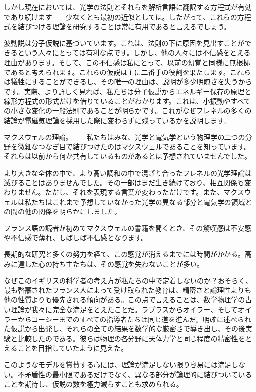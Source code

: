 \documentclass[a4paper,11pt,openany]{ltjsbook}
\begin{document}
しかし現在においては、光学の法則とそれらを解析言語に翻訳する方程式が有効であり続けます——少なくとも最初の近似としては。したがって、これらの方程式を結びつける理論を研究することは常に有用であると言えるでしょう。

波動説は分子仮説に基づいています。これは、法則の下に原因を見出すことができるという人々にとっては有利な点です。しかし、他の人々には不信感をとえる理由があります。そして、この不信感は私にとって、以前の幻覚と同様に無根拠であると考えられます。これらの仮説は主に二番手の役割を果たします。これらは犠牲にすることができるし、その唯一の理由は、説明が多少明瞭さを失うからです。実際、より詳しく見れば、私たちは分子仮説からエネルギー保存の原理と線形方程式の形式だけを借りていることがわかります。これは、小振動やすべての小さな変化の一般法則であることが明らかです。これがなぜフレネルの多くの結論が電磁気理論を採用した際に変わらずに残っているかを説明します。

マクスウェルの理論。——私たちはみな、光学と電気学という物理学の二つの分野を微細なつなぎ目で結びつけたのはマクスウェルであることを知っています。それらは以前から何か共有しているものがあるとは予想されていませんでした。

より大きな全体の中で、より高い調和の中で混ざり合ったフレネルの光学理論は滅びることはありませんでした。その一部はまだ生き続けており、相互関係も変わりません。ただし、それを表現する言葉が変わっただけです。また、マクスウェルは私たちはこれまで予想していなかった光学の異なる部分と電気学の領域との間の他の関係を明らかにしました。

フランス語の読者が初めてマクスウェルの書籍を開くとき、その驚嘆感は不安感や不信感で薄れ、しばしば不信感となります。

長期的な研究と多くの努力を経て、この感覚が消えるまでには時間がかかる。高みに達した心の持ち主たちは、その感覚を失わないことが多い。

なぜこのイギリスの科学者の考え方が私たちの中で定着しないのか？おそらく、最も啓蒙されたフランス人によって受け取られた教育は、精密さと論理性よりも他の性質よりも優先される傾向がある。この点で言えることは、数学物理学の古い理論が我々に完全な満足をとえたことだ。ラプラスからオイラー、そしてオイラーからコーシーまでのすべての指導者たちは同じ道を進んだ。明確に述べられた仮説から出発し、それらの全ての結果を数学的な厳密さで導き出し、その後実験と比較したのである。彼らは物理の各分野に天体力学と同じ程度の精密性をとえることを目指していたように見えた。

このようなモデルを賞賛する心には、理論が満足しない限り容易には満足しない。不矛盾性の最小限であるだけでなく、異なる部分が論理的に結びついていることを期待し、仮説の数を極力減らすことも求められる。
\end{document}
